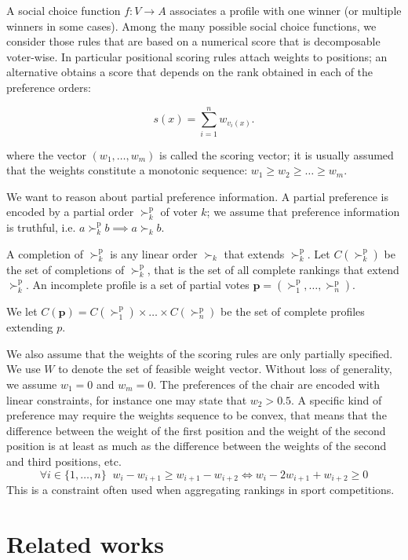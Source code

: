 \documentclass[12pt]{article}
\newcommand{\pref}{{\succ}}%
\newcommand{\ppref}{\succ^\text{p}}%
\begin{document}
A social choice function $f : V \rightarrow A$ associates a profile with one winner (or multiple winners in some cases).
Among the many possible social choice functions, we consider those rules that are based on a numerical score that is decomposable voter-wise.
In particular positional scoring rules attach weights to positions;
an alternative obtains a score that depends on the rank obtained in each of the preference orders:

\[ s(x) = \sum_{i=1}^{n} w_{v_i(x)}. \]

where the vector $(w_1,\ldots,w_m)$ is called the scoring vector;
 it is usually assumed that the weights constitute a monotonic sequence: $w_{1} \geq w_{2} \geq \ldots \geq w_{m}$.

\medskip
We want to reason about partial preference information.
A partial preference  is encoded by a partial order $\ppref_k$  of voter $k$;
we assume that preference information is truthful, i.e. $a \ppref_k b \implies a \pref_k b$.

A completion of $\ppref_k$ is any linear order $\pref_k$ that extends $\ppref_k$.
Let $C(\ppref_k)$ be the set of completions of $\ppref_k$, that is the set of all complete rankings that extend $\ppref_k$.
An incomplete profile is a set of partial votes %
$\textbf{p}=(\ppref_1,\ldots,\ppref_n)$.

We let $C(\textbf{p})=C(\ppref_1)\times \ldots \times C(\ppref_n)$ be the set of complete profiles extending $p$.

\medskip
We also assume that the weights of the scoring rules are only partially specified.
We use $W$ to denote the set of feasible weight vector.
Without loss of generality, we assume $w_1=0$ and $w_m=0$.
The preferences of the chair are encoded with linear constraints, for instance one may state
that $w_2>0.5$.
A specific kind of preference may require the weights sequence to be convex, that means
that the difference between the weight of the first position and the weight of the second position is at least as much as the difference between the weights of the second and third positions, etc. 
\[ \forall i \in \{1,\ldots,n\} \;\; w_i - w_{i+1} \geq w_{i+1}-w_{i+2} \iff  w_i - 2 w_{i+1} + w_{i+2} \geq 0 \]
This is a constraint often used when aggregating rankings in sport competitions.

\section*{Related works}
\end{document}
